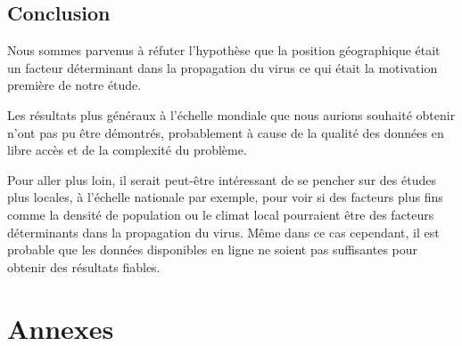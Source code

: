 \documentclass[12pt]{iEEEtran}
\begin{document}
\subsection{Conclusion}

Nous sommes parvenus à réfuter l'hypothèse que la position géographique était un facteur
déterminant dans la propagation du virus ce qui était la motivation première de notre étude.

Les résultats plus généraux à l'échelle mondiale que nous aurions souhaité obtenir n'ont
pas pu être démontrés, probablement à cause de la qualité des données en libre accès
et de la complexité du problème. 

Pour aller plus loin, il serait peut-être intéressant de se pencher sur des études
plus locales, à l'échelle nationale par exemple, pour voir si des facteurs plus fins
comme la densité de population ou le climat local pourraient être des facteurs déterminants
dans la propagation du virus. Même dans ce cas cependant, il est probable que les données
disponibles en ligne ne soient pas suffisantes pour obtenir des résultats fiables.

\newpage



\newpage

\section*{Annexes}
\renewcommand{\thefigure}{A\arabic{figure}}
\setcounter{figure}{0}
\end{document}
